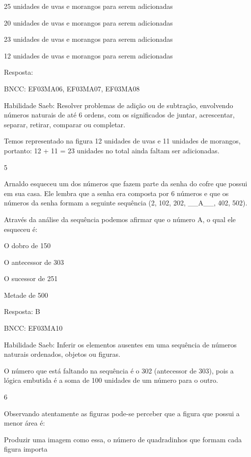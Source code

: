 \begin{escolha}
{\begin{escolha}
{\begin{escolha}
\item
  25 unidades de uvas e morangos para serem adicionadas
\item
  20 unidades de uvas e morangos para serem adicionadas
\item
  23 unidades de uvas e morangos para serem adicionadas
\item
  12 unidades de uvas e morangos para serem adicionadas
\end{escolha}

Resposta:

BNCC: EF03MA06, EF03MA07, EF03MA08

Habilidade Saeb: Resolver problemas de adição ou de subtração,
envolvendo números naturais de até 6 ordens, com os significados de
juntar, acrescentar, separar, retirar, comparar ou completar.

Temos representado na figura 12 unidades de uvas e 11 unidades de
morangos, portanto: 12 + 11 = 23 unidades no total ainda faltam ser
adicionadas.

\num{5}

Arnaldo esqueceu um dos números que fazem parte da senha do cofre que
possui em sua casa. Ele lembra que a senha era composta por 6 números e
que os números da senha formam a seguinte sequência (2, 102, 202,
\_\_A\_\_, 402, 502).

Através da análise da sequência podemos afirmar que o número A, o qual
ele esqueceu é:

\begin{escolha}

\item
  O dobro de 150
\item
  O antecessor de 303
\item
  O sucessor de 251
\item
  Metade de 500
\end{escolha}

Resposta: B

BNCC: EF03MA10

Habilidade Saeb: Inferir os elementos ausentes em uma sequência de
números naturais ordenados, objetos ou figuras.

O número que está faltando na sequência é o 302 (antecessor de 303),
pois a lógica embutida é a soma de 100 unidades de um número para o
outro.

\num{6}

Observando atentamente as figuras pode-se perceber que a figura que
possui a menor área é:

Produzir uma imagem como essa, o número de quadradinhos que formam cada
figura importa

}
\end{escolha}}
\end{escolha}
